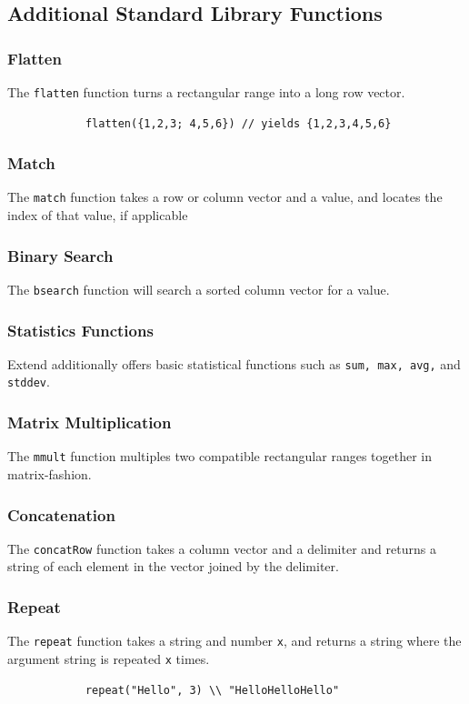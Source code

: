 	\subsection{Additional Standard Library Functions}

		\subsubsection{Flatten}
		The \texttt{flatten} function turns a rectangular range into a long row vector.

		\begin{lstlisting}
			flatten({1,2,3; 4,5,6}) // yields {1,2,3,4,5,6}
		\end{lstlisting}

		\subsubsection{Match}
		The \texttt{match} function takes a row or column vector and a value, and locates the index of that value, if applicable

		\subsubsection{Binary Search}
		The \texttt{bsearch} function will search a sorted column vector for a value.

		\subsubsection{Statistics Functions}
		Extend additionally offers basic statistical functions such as \texttt{sum, max, avg,} and \texttt{stddev}.

		\subsubsection{Matrix Multiplication}
		The \texttt{mmult} function multiples two compatible rectangular ranges together in matrix-fashion.

		\subsubsection{Concatenation}
		The \texttt{concatRow} function takes a column vector and a delimiter and returns a string of each element in the vector joined by the delimiter.

		\subsubsection{Repeat}
		The \texttt{repeat} function takes a string and number \texttt{x}, and returns a string where the argument string is repeated \texttt{x} times.
		\begin{lstlisting}
			repeat("Hello", 3) \\ "HelloHelloHello"
		\end{lstlisting}

